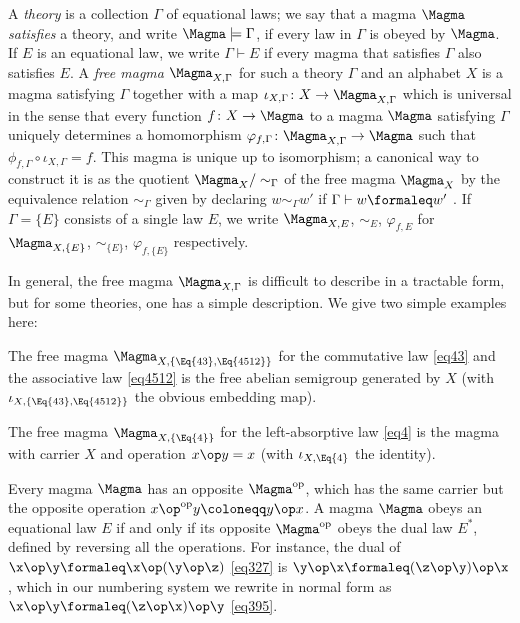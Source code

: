 A \emph{theory} is a collection $\Gamma$ of equational laws; we say that a magma $\Magma$ \emph{satisfies} a theory, and write $\Magma \models \Gamma$, if every law in $\Gamma$ is obeyed by $\Magma$.  If $E$ is an equational law, we write $\Gamma \vdash E$ if every magma that satisfies $\Gamma$ also satisfies $E$. A \emph{free magma} $\Magma_{X,\Gamma}$ for such a theory $\Gamma$ and an alphabet $X$ is a magma satisfying $\Gamma$ together with a map $\iota_{X,\Gamma} \colon X \to \Magma_{X,\Gamma}$ which is universal in the sense that every function $f \colon X \to \Magma$ to a magma $\Magma$ satisfying $\Gamma$ uniquely determines a homomorphism $\varphi_{f,\Gamma} \colon \Magma_{X,\Gamma} \to \Magma$ such that $\phi_{f,\Gamma} \circ \iota_{X,\Gamma} = f$.  This magma is unique up to isomorphism; a canonical way to construct it is as the quotient $\Magma_X/\sim_\Gamma$ of the free magma $\Magma_X$ by the equivalence relation $\sim_\Gamma$ given by declaring $w \sim_\Gamma w'$ if $\Gamma \vdash w \formaleq w'$ \cite[Theorem 3.5.6]{term-rewriting}.  If $\Gamma = \{E\}$ consists of a single law $E$, we write $\Magma_{X,E}$, $\sim_E$, $\varphi_{f,E}$ for $\Magma_{X,\{E\}}$, $\sim_{\{E\}}$, $\varphi_{f,\{E\}}$ respectively.

In general, the free magma $\Magma_{X,\Gamma}$ is difficult to describe in a tractable form, but for some theories, one has a simple description.  We give two simple examples here:

\begin{example}\label{semi-group} The free magma $\Magma_{X,\{\Eq{43}, \Eq{4512}\}}$ for the commutative law \eqref{eq43} and the associative law \eqref{eq4512} is the free abelian semigroup generated by $X$ (with $\iota_{X,\{\Eq{43},\Eq{4512}\}}$ the obvious embedding map).
\end{example}

\begin{example}\label{left-absorb}
The free magma $\Magma_{X,\{\Eq{4}\}}$ for the left-absorptive law \eqref{eq4} is the magma with carrier $X$ and operation $x \op y = x$ (with $\iota_{X,\Eq{4}}$ the identity).
\end{example}


Every magma $\Magma$ has an opposite $\Magma^{\mathrm{op}}$, which has the same carrier but the opposite operation $x \op^{\mathrm{op}} y \coloneqq y \op x$.  A magma $\Magma$ obeys an equational law $E$ if and only if its opposite $\Magma^{\mathrm{op}}$ obeys the dual law $E^*$, defined by reversing all the operations.  For instance, the dual of
$\x \op \y \formaleq \x \op (\y \op \z)$ \eqref{eq327} is $\y \op \x \formaleq (\z \op \y) \op \x$, which in our numbering system we rewrite in normal form as $\x \op \y \formaleq (\z \op \x) \op \y$ \eqref{eq395}.

